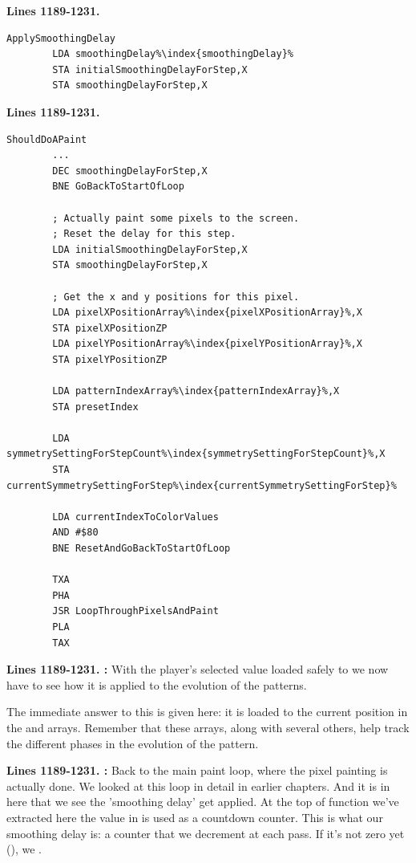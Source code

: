 \clearpage

\textbf{Lines 1189-1231. }
\begin{lstlisting}[caption=From \icode{MainInterruptHandler}.,escapechar=\%]
ApplySmoothingDelay    
        LDA smoothingDelay%\index{smoothingDelay}%
        STA initialSmoothingDelayForStep,X
        STA smoothingDelayForStep,X
\end{lstlisting}
\textbf{Lines 1189-1231. }
\begin{lstlisting}[caption=From \icode{MainPaintLoop\index{MainPaintLoop}}.,escapechar=\%]
ShouldDoAPaint   
        ...
        DEC smoothingDelayForStep,X
        BNE GoBackToStartOfLoop

        ; Actually paint some pixels to the screen.
        ; Reset the delay for this step.
        LDA initialSmoothingDelayForStep,X
        STA smoothingDelayForStep,X

        ; Get the x and y positions for this pixel.
        LDA pixelXPositionArray%\index{pixelXPositionArray}%,X
        STA pixelXPositionZP
        LDA pixelYPositionArray%\index{pixelYPositionArray}%,X
        STA pixelYPositionZP

        LDA patternIndexArray%\index{patternIndexArray}%,X
        STA presetIndex

        LDA symmetrySettingForStepCount%\index{symmetrySettingForStepCount}%,X
        STA currentSymmetrySettingForStep%\index{currentSymmetrySettingForStep}%

        LDA currentIndexToColorValues
        AND #$80
        BNE ResetAndGoBackToStartOfLoop

        TXA 
        PHA 
        JSR LoopThroughPixelsAndPaint
        PLA 
        TAX 
\end{lstlisting}
\clearpage

\textbf{Lines 1189-1231. :} With the player's selected value loaded 
safely to  we now have to see how it is applied to the evolution of the patterns.

The immediate answer to this is given here: it is loaded to the current position in the 
 and  arrays. Remember that these
arrays, along with several others, help track the different phases in the evolution of the pattern.


\textbf{Lines 1189-1231. :}  Back to the main paint loop, where the
pixel painting is actually done. We looked at this loop in detail in earlier chapters. And it is in
here that we see the 'smoothing delay' get applied. At the top of function we've extracted here
the value in  is used as a countdown counter. This is what our
smoothing delay is: a counter that we decrement at each pass. If it's not zero yet (),
we .

